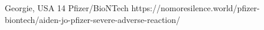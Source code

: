           {Georgie, USA}
          {14}
          {Pfizer/BioNTech}
          {}
          {}
          {https://nomoresilence.world/pfizer-biontech/aiden-jo-pfizer-severe-adverse-reaction/}
